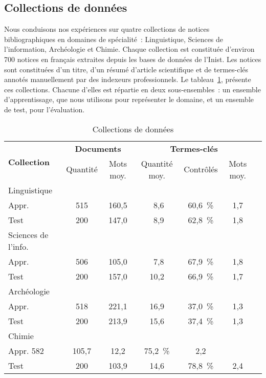   \subsection{Collections de données}
  \label{subsec:main-domain_specific_keyphrase_annotation-supervised_automatic_keyphrase_annotation-evaluation-evaluation_data}
    Nous conduisons nos expériences sur quatre collections de notices
    bibliographiques en domaines de spécialité~: Linguistique, Sciences de
    l'information, Archéologie et Chimie. Chaque collection est constituée
    d'environ 700 notices en français extraites depuis les bases de données de
    l'Inist. Les notices sont constituées d'un titre, d'un résumé d'article
    scientifique et de termes-clés annotés manuellement par des indexeurs
    professionnels. Le tableau~\ref{tab:termith},
    présente ces collections. Chacune d'elles est répartie en deux
    sous-ensembles~: un ensemble d'apprentissage, que nous utilisons pour
    représenter le domaine, et un ensemble de test, pour l'évaluation.
    \begin{table}[!h]
      \centering
      \begin{tabular}{l|c@{~~}c|c@{~~}c@{~~}c@{~~}c}
        \toprule
        \multirow{2}{*}{\textbf{Collection}} & \multicolumn{2}{c|}{\textbf{Documents}} & \multicolumn{3}{c}{\textbf{Termes-clés}}\\
        \cline{2-6}
        & Quantité & Mots moy. & Quantité moy. & Contrôlés & Mots moy.\\
        \hline
        Linguistique & & & &\\
        \hfill{}Appr. & 515 & 160,5 & $~~$8,6 & 60,6~\% & 1,7\\
         \hfill{}Test & 200 & 147,0 & $~~$8,9 & 62,8~\% & 1,8\\
        \hline
        Sciences de l'info. & & & &\\
        \hfill{}Appr. & 506 & 105,0 & $~~$7,8 & 67,9~\% & 1,8\\
        \hfill{}Test & 200 & 157,0 & 10,2 & 66,9~\% & 1,7\\
        \hline
        Archéologie & & & &\\
        \hfill{}Appr. & 518 & 221,1 & 16,9 & 37,0~\% & 1,3\\
        \hfill{}Test & 200 & 213,9 & 15,6 & 37,4~\% & 1,3\\
        \hline
        Chimie & & & &\\
        \hfill{}Appr. 582 & 105,7 & 12,2 & 75,2~\% & 2,2\\
        \hfill{}Test & 200 & 103,9 & 14,6 & 78,8~\% & 2,4\\
        \bottomrule
      \end{tabular}

      \caption{Collections de données
               \label{tab:termith}}
    \end{table}

